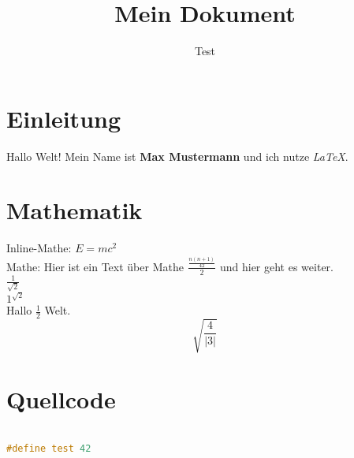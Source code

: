 \documentclass{article}
\title{Mein Dokument}
\author{Test}
\begin{document}
\maketitle

\section{Einleitung}
Hallo Welt! 
Mein Name ist \textbf{Max Mustermann} und ich nutze \textit{LaTeX}.

\section{Mathematik}
Inline-Mathe: $E = mc^2$  \\
Mathe: Hier ist ein Text über Mathe \(\frac{\frac{n(n+1)}{ 42}}{ 2}\) und hier geht es weiter.\\  

\(\frac{1}{ \sqrt{2}}\) \\

\({1}^{ \sqrt{2}}\) \\

Hallo \(\frac{1}{ 2}\) Welt.  
\[\sqrt{\frac{4}{ \left|3\right|}}\]



\section{Quellcode}

\begin{lstlisting}[language=c++]

#define test 42

\end{lstlisting}
\end{document}
